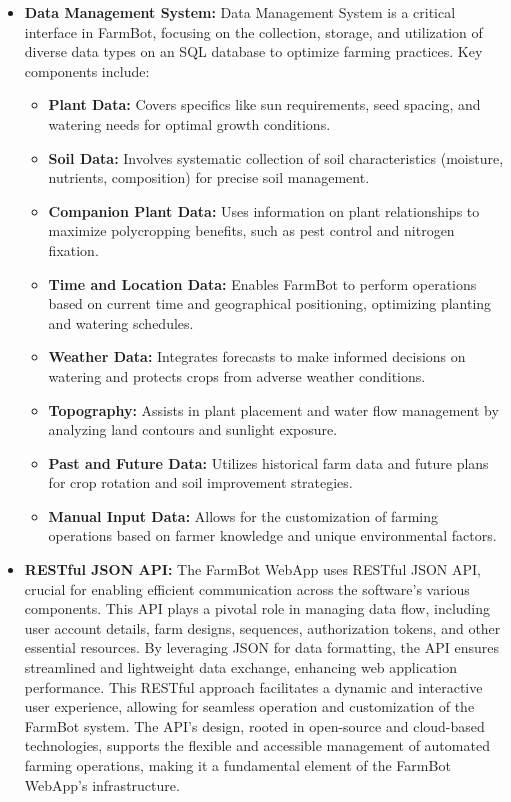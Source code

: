 \begin{itemize}
    \item \textbf{Data Management System:} Data Management System is a critical interface in FarmBot, focusing on the collection, storage, and utilization of diverse data types on an SQL database to optimize farming practices. Key components include:
    \begin{itemize}
        \item \textbf{Plant Data:} Covers specifics like sun requirements, seed spacing, and watering needs for optimal growth conditions.
        \item \textbf{Soil Data:} Involves systematic collection of soil characteristics (moisture, nutrients, composition) for precise soil management.
        \item \textbf{Companion Plant Data:} Uses information on plant relationships to maximize polycropping benefits, such as pest control and nitrogen fixation.
        \item \textbf{Time and Location Data:} Enables FarmBot to perform operations based on current time and geographical positioning, optimizing planting and watering schedules.
        \item \textbf{Weather Data:} Integrates forecasts to make informed decisions on watering and protects crops from adverse weather conditions.
        \item \textbf{Topography:} Assists in plant placement and water flow management by analyzing land contours and sunlight exposure.
        \item \textbf{Past and Future Data:} Utilizes historical farm data and future plans for crop rotation and soil improvement strategies.
        \item \textbf{Manual Input Data:} Allows for the customization of farming operations based on farmer knowledge and unique environmental factors.
    \end{itemize}
        
    \item \textbf{RESTful JSON API:} The FarmBot WebApp uses RESTful JSON API, crucial for enabling efficient communication across the software's various components. This API plays a pivotal role in managing data flow, including user account details, farm designs, sequences, authorization tokens, and other essential resources. By leveraging JSON for data formatting, the API ensures streamlined and lightweight data exchange, enhancing web application performance. This RESTful approach facilitates a dynamic and interactive user experience, allowing for seamless operation and customization of the FarmBot system. The API's design, rooted in open-source and cloud-based technologies, supports the flexible and accessible management of automated farming operations, making it a fundamental element of the FarmBot WebApp's infrastructure.


\end{itemize}
